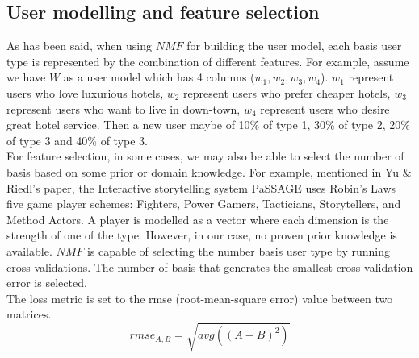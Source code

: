 \documentclass[11pt]{article} %
\begin{document}
\subsection{User modelling and feature selection}
As has been said, when using $NMF$ for building the user model, each basis user type is represented by the combination of different features. For example, assume we have $W$ as a user model which has 4 columns ($w_{1}, w_{2}, w_{3}, w_{4}$). $w_{1}$ represent users who love luxurious hotels, $w_{2}$ represent users who prefer cheaper hotels, $w_{3}$ represent users who want to live in down-town, $w_{4}$ represent users who desire great hotel service. Then a new user maybe of 10\% of type 1, 30\% of type 2, 20\% of type 3 and 40\% of type 3.\\    
For feature selection, in some cases, we may also be able to select the number of basis based on some prior or domain knowledge. For example, mentioned in Yu \& Riedl's paper, the Interactive storytelling system PaSSAGE uses Robin’s Laws five game player schemes: Fighters, Power Gamers, Tacticians, Storytellers, and Method Actors. A player is modelled as a vector where each dimension is the strength of one of the type\citep[p.2]{nmf1}. However, in our case, no proven prior knowledge is available. $NMF$ is capable of selecting the number basis user type by running cross validations. The number of basis that generates the smallest cross validation error is selected.\\
The loss metric is set to the rmse (root-mean-square error) value between two matrices.
\begin{equation}
rmse_{A,B} = \sqrt{avg((A-B)^{2})}
\end{equation}
\end{document}
